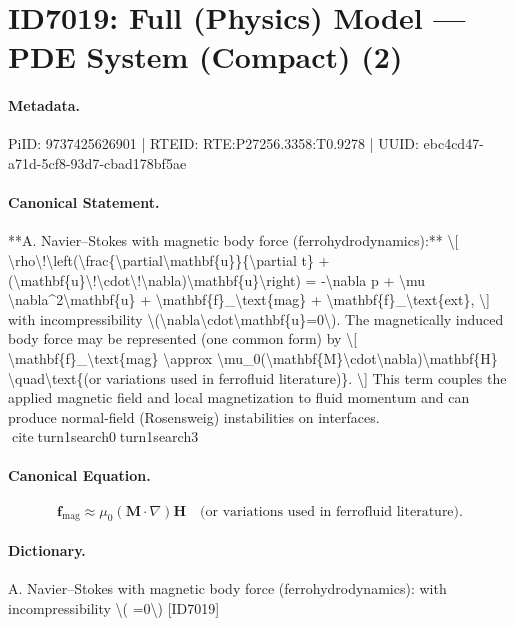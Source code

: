 \section*{ID7019: Full (Physics) Model — PDE System (Compact) (2)}
\paragraph{Metadata.}
PiID: 9737425626901 | RTEID: RTE:P27256.3358:T0.9278 | UUID: ebc4cd47-a71d-5cf8-93d7-cbad178bf5ae

\paragraph{Canonical Statement.}
**A. Navier–Stokes with magnetic body force (ferrohydrodynamics):** \textbackslash{}[ \textbackslash{}rho\textbackslash{}!\textbackslash{}left(\textbackslash{}frac\{\textbackslash{}partial\textbackslash{}mathbf\{u\}\}\{\textbackslash{}partial t\} + (\textbackslash{}mathbf\{u\}\textbackslash{}!\textbackslash{}cdot\textbackslash{}!\textbackslash{}nabla)\textbackslash{}mathbf\{u\}\textbackslash{}right) = -\textbackslash{}nabla p + \textbackslash{}mu \textbackslash{}nabla\textasciicircum{}2\textbackslash{}mathbf\{u\} + \textbackslash{}mathbf\{f\}\_\textbackslash{}text\{mag\} + \textbackslash{}mathbf\{f\}\_\textbackslash{}text\{ext\}, \textbackslash{}] with incompressibility \textbackslash{}(\textbackslash{}nabla\textbackslash{}cdot\textbackslash{}mathbf\{u\}=0\textbackslash{}). The magnetically induced body force may be represented (one common form) by \textbackslash{}[ \textbackslash{}mathbf\{f\}\_\textbackslash{}text\{mag\} \textbackslash{}approx \textbackslash{}mu\_0(\textbackslash{}mathbf\{M\}\textbackslash{}cdot\textbackslash{}nabla)\textbackslash{}mathbf\{H\} \textbackslash{}quad\textbackslash{}text\{(or variations used in ferrofluid literature)\}. \textbackslash{}] This term couples the applied magnetic field and local magnetization to fluid momentum and can produce normal-field (Rosensweig) instabilities on interfaces. citeturn1search0turn1search3

\paragraph{Canonical Equation.}
\[
\mathbf{f}_\text{mag} \approx \mu_0(\mathbf{M}\cdot\nabla)\mathbf{H} \quad\text{(or variations used in ferrofluid literature)}.
\]

\paragraph{Dictionary.}
A. Navier–Stokes with magnetic body force (ferrohydrodynamics): with incompressibility \textbackslash{}( =0\textbackslash{}) [ID7019]

